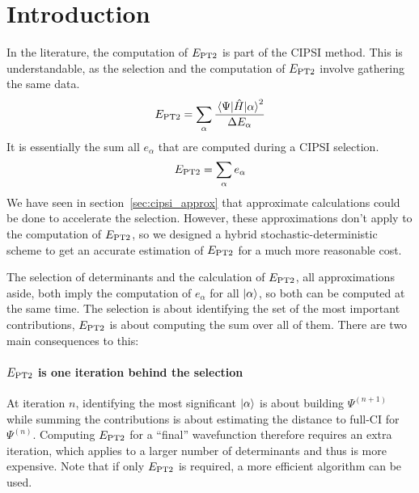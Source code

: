 \documentclass[./thesis.tex]{subfiles}
\begin{document}
\label{chap:PT2}

\section{Introduction}


In the literature, the computation of $E_\text{PT2}$ is part of the CIPSI method. This is understandable, as the selection and the computation of $E_\text{PT2}$ involve gathering the same data.
\begin{equation}
E_\text{PT2} = \sum_\alpha \frac{\mel{\Psi}{\hat{H}}{\alpha}^2}{\Delta E_\alpha}
\end{equation}
It is essentially the sum all $e_\alpha$ that are computed during a CIPSI selection.
\begin{equation}
E_\text{PT2} = \sum_\alpha e_\alpha
\end{equation}
We have seen in section~\ref{sec:cipsi_approx} that approximate calculations could be done to accelerate the selection. However, these approximations don't apply to the computation of $E_\text{PT2}$, so we designed a hybrid stochastic-deterministic scheme to get an accurate estimation of $E_\text{PT2}$ for a much more reasonable cost. 


The selection of determinants and the calculation of $E_\text{PT2}$, all approximations aside, both imply the computation of $e_\alpha$ for all $\ket \alpha$, so both can be computed at the same time. The selection is about identifying the set of the most important contributions, $E_\text{PT2}$ is about computing the sum over all of them. There are two main consequences to this:
\paragraph{$E_\text{PT2}$ is one iteration behind the selection}
At iteration $n$, identifying the most significant $\ket \alpha$ is about building $\Psi^{(n+1)}$ while summing the contributions is about estimating the distance to full-CI for $\Psi^{(n)}$. Computing $E_\text{PT2}$ for a ``final'' wavefunction therefore requires an extra iteration, which applies to a larger number of determinants and thus is more expensive. Note that if only $E_\text{PT2}$ is required, a more efficient algorithm can be used.\cite{Cimiraglia_1996}
\end{document}
